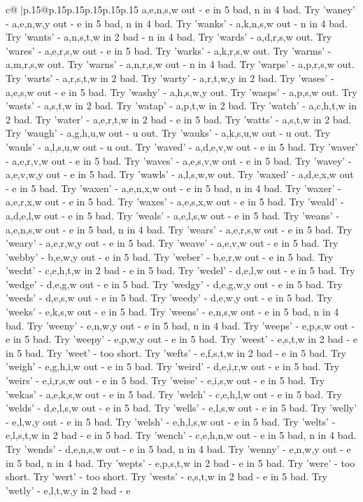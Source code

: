 \documentclass{article}
\begin{document}
{\begin{supertabular}{c@{$\;$}|p{.15\linewidth}@{}p{.15\linewidth}p{.15\linewidth}p{.15\linewidth}p{.15\linewidth}p{.15\linewidth}}
{{{a,e,n,s,w out {-} e in 5 bad, n in 4 bad. Try 'waney' {-} a,e,n,w,y out {-} e in 5 bad, n in 4 bad. Try 'wanks' {-} a,k,n,s,w out {-} n in 4 bad. Try 'wants' {-} a,n,s,t,w in 2 bad {-} n in 4 bad. Try 'wards' {-} a,d,r,s,w out. Try 'wares' {-} a,e,r,s,w out {-} e in 5 bad. Try 'warks' {-} a,k,r,s,w out. Try 'warms' {-} a,m,r,s,w out. Try 'warns' {-} a,n,r,s,w out {-} n in 4 bad. Try 'warps' {-} a,p,r,s,w out. Try 'warts' {-} a,r,s,t,w in 2 bad. Try 'warty' {-} a,r,t,w,y in 2 bad. Try 'wases' {-} a,e,s,w out {-} e in 5 bad. Try 'washy' {-} a,h,s,w,y out. Try 'wasps' {-} a,p,s,w out. Try 'wasts' {-} a,s,t,w in 2 bad. Try 'watap' {-} a,p,t,w in 2 bad. Try 'watch' {-} a,c,h,t,w in 2 bad. Try 'water' {-} a,e,r,t,w in 2 bad {-} e in 5 bad. Try 'watts' {-} a,s,t,w in 2 bad. Try 'waugh' {-} a,g,h,u,w out {-} u out. Try 'wauks' {-} a,k,s,u,w out {-} u out. Try 'wauls' {-} a,l,s,u,w out {-} u out. Try 'waved' {-} a,d,e,v,w out {-} e in 5 bad. Try 'waver' {-} a,e,r,v,w out {-} e in 5 bad. Try 'waves' {-} a,e,s,v,w out {-} e in 5 bad. Try 'wavey' {-} a,e,v,w,y out {-} e in 5 bad. Try 'wawls' {-} a,l,s,w,w out. Try 'waxed' {-} a,d,e,x,w out {-} e in 5 bad. Try 'waxen' {-} a,e,n,x,w out {-} e in 5 bad, n in 4 bad. Try 'waxer' {-} a,e,r,x,w out {-} e in 5 bad. Try 'waxes' {-} a,e,s,x,w out {-} e in 5 bad. Try 'weald' {-} a,d,e,l,w out {-} e in 5 bad. Try 'weals' {-} a,e,l,s,w out {-} e in 5 bad. Try 'weans' {-} a,e,n,s,w out {-} e in 5 bad, n in 4 bad. Try 'wears' {-} a,e,r,s,w out {-} e in 5 bad. Try 'weary' {-} a,e,r,w,y out {-} e in 5 bad. Try 'weave' {-} a,e,v,w out {-} e in 5 bad. Try 'webby' {-} b,e,w,y out {-} e in 5 bad. Try 'weber' {-} b,e,r,w out {-} e in 5 bad. Try 'wecht' {-} c,e,h,t,w in 2 bad {-} e in 5 bad. Try 'wedel' {-} d,e,l,w out {-} e in 5 bad. Try 'wedge' {-} d,e,g,w out {-} e in 5 bad. Try 'wedgy' {-} d,e,g,w,y out {-} e in 5 bad. Try 'weeds' {-} d,e,s,w out {-} e in 5 bad. Try 'weedy' {-} d,e,w,y out {-} e in 5 bad. Try 'weeks' {-} e,k,s,w out {-} e in 5 bad. Try 'weens' {-} e,n,s,w out {-} e in 5 bad, n in 4 bad. Try 'weeny' {-} e,n,w,y out {-} e in 5 bad, n in 4 bad. Try 'weeps' {-} e,p,s,w out {-} e in 5 bad. Try 'weepy' {-} e,p,w,y out {-} e in 5 bad. Try 'weest' {-} e,s,t,w in 2 bad {-} e in 5 bad. Try 'weet' {-} too short. Try 'wefts' {-} e,f,s,t,w in 2 bad {-} e in 5 bad. Try 'weigh' {-} e,g,h,i,w out {-} e in 5 bad. Try 'weird' {-} d,e,i,r,w out {-} e in 5 bad. Try 'weirs' {-} e,i,r,s,w out {-} e in 5 bad. Try 'weise' {-} e,i,s,w out {-} e in 5 bad. Try 'wekas' {-} a,e,k,s,w out {-} e in 5 bad. Try 'welch' {-} c,e,h,l,w out {-} e in 5 bad. Try 'welds' {-} d,e,l,s,w out {-} e in 5 bad. Try 'wells' {-} e,l,s,w out {-} e in 5 bad. Try 'welly' {-} e,l,w,y out {-} e in 5 bad. Try 'welsh' {-} e,h,l,s,w out {-} e in 5 bad. Try 'welts' {-} e,l,s,t,w in 2 bad {-} e in 5 bad. Try 'wench' {-} c,e,h,n,w out {-} e in 5 bad, n in 4 bad. Try 'wends' {-} d,e,n,s,w out {-} e in 5 bad, n in 4 bad. Try 'wenny' {-} e,n,w,y out {-} e in 5 bad, n in 4 bad. Try 'wepts' {-} e,p,s,t,w in 2 bad {-} e in 5 bad. Try 'were' {-} too short. Try 'wert' {-} too short. Try 'wests' {-} e,s,t,w in 2 bad {-} e in 5 bad. Try 'wetly' {-} e,l,t,w,y in 2 bad {-} e }}}
\end{supertabular}}
\end{document}
